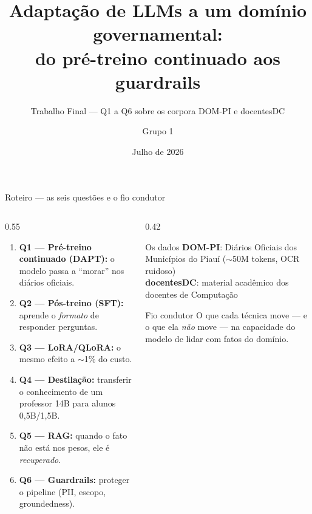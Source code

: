 \documentclass[10pt,aspectratio=169]{beamer}
\title[Trabalho Final — LLMs no DOM-PI]{Adaptação de LLMs a um domínio governamental:\\ do pré-treino continuado aos guardrails}
\subtitle{Trabalho Final — Q1 a Q6 sobre os corpora DOM-PI e docentesDC}
\author{Grupo 1}
\institute{Tópicos em Inteligência Artificial}
\date{Julho de 2026}
\begin{document}
\begin{frame}
  \titlepage
\end{frame}

\begin{frame}{Roteiro — as seis questões e o fio condutor}
  \begin{columns}[T]
    \begin{column}{0.55\textwidth}
      \begin{enumerate}
        \item \textbf{Q1 — Pré-treino continuado (DAPT):} o modelo passa a ``morar'' nos diários oficiais.
        \item \textbf{Q2 — Pós-treino (SFT):} aprende o \emph{formato} de responder perguntas.
        \item \textbf{Q3 — LoRA/QLoRA:} o mesmo efeito a $\sim$1\% do custo.
        \item \textbf{Q4 — Destilação:} transferir o conhecimento de um professor 14B para alunos 0,5B/1,5B.
        \item \textbf{Q5 — RAG:} quando o fato não está nos pesos, ele é \emph{recuperado}.
        \item \textbf{Q6 — Guardrails:} proteger o pipeline (PII, escopo, groundedness).
      \end{enumerate}
    \end{column}
    \begin{column}{0.42\textwidth}
      \begin{block}{Os dados}
        \textbf{DOM-PI}: Diários Oficiais dos Municípios do Piauí ($\sim$50M tokens, OCR ruidoso) \\[2pt]
        \textbf{docentesDC}: material acadêmico dos docentes de Computação
      \end{block}
      \begin{block}{Fio condutor}
        O que cada técnica move — e o que ela \emph{não} move — na capacidade do modelo de lidar com fatos do domínio.
      \end{block}
    \end{column}
  \end{columns}
\end{frame}
\end{document}
